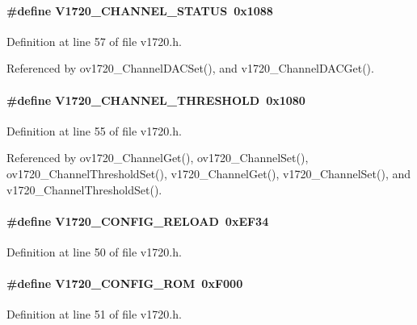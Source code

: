\paragraph[{V1720\_\-CHANNEL\_\-STATUS}]{\setlength{\rightskip}{0pt plus 5cm}\#define V1720\_\-CHANNEL\_\-STATUS~0x1088}\hfill\label{v1720_8h_a32dc62a8ebe2c90b72eca2adf882ed36}


Definition at line 57 of file v1720.h.

Referenced by ov1720\_\-ChannelDACSet(), and v1720\_\-ChannelDACGet().
\paragraph[{V1720\_\-CHANNEL\_\-THRESHOLD}]{\setlength{\rightskip}{0pt plus 5cm}\#define V1720\_\-CHANNEL\_\-THRESHOLD~0x1080}\hfill\label{v1720_8h_aa17588e88cc544e81bff2af019f5a523}


Definition at line 55 of file v1720.h.

Referenced by ov1720\_\-ChannelGet(), ov1720\_\-ChannelSet(), ov1720\_\-ChannelThresholdSet(), v1720\_\-ChannelGet(), v1720\_\-ChannelSet(), and v1720\_\-ChannelThresholdSet().
\paragraph[{V1720\_\-CONFIG\_\-RELOAD}]{\setlength{\rightskip}{0pt plus 5cm}\#define V1720\_\-CONFIG\_\-RELOAD~0xEF34}\hfill\label{v1720_8h_ac5b4d0ba3a3af8010724ec84005a33aa}


Definition at line 50 of file v1720.h.
\paragraph[{V1720\_\-CONFIG\_\-ROM}]{\setlength{\rightskip}{0pt plus 5cm}\#define V1720\_\-CONFIG\_\-ROM~0xF000}\hfill\label{v1720_8h_a9ca2b94623e68d648559757c4d01b783}


Definition at line 51 of file v1720.h.

